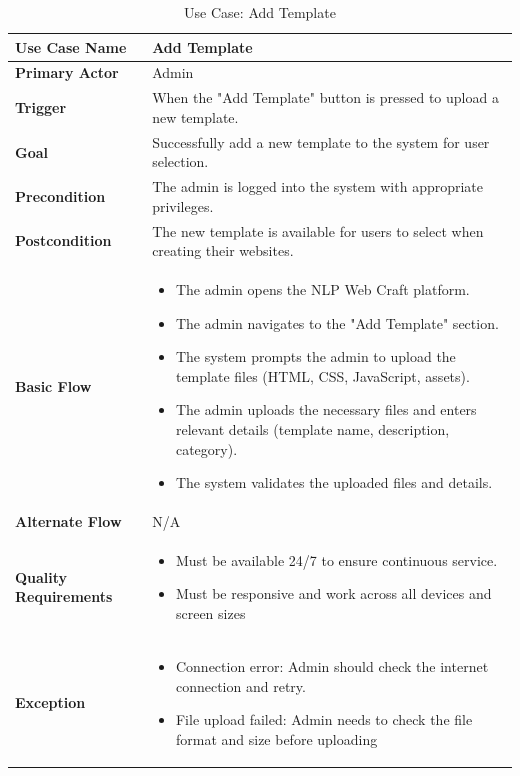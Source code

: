 \documentclass[12pt]{report}
\begin{document}
\clearpage
\begin{table}[h!]

\begin{tabular}{|p{3.5cm}|p{10cm}|}
\hline
\textbf{Use Case Name} & Add Template \\ 
\hline
\textbf{Primary Actor} & Admin \\ 
\hline
\textbf{Trigger} & When the "Add Template" button is pressed to upload a new template. \\ 
\hline
\textbf{Goal} & Successfully add a new template to the system for user selection. \\ 
\hline
\textbf{Precondition} & The admin is logged into the system with appropriate privileges. \\ 
\hline
\textbf{Postcondition} & The new template is available for users to select when creating their websites. \\ 
\hline
\textbf{Basic Flow} & 
\begin{itemize}
    \item The admin opens the NLP Web Craft platform.
    \item The admin navigates to the "Add Template" section.
    \item The system prompts the admin to upload the template files (HTML, CSS, JavaScript, assets).
    \item The admin uploads the necessary files and enters relevant details (template name, description, category).
    \item The system validates the uploaded files and details.
\end{itemize} \\ 
\hline
\textbf{Alternate Flow} & N/A \\ 
\hline
\textbf{Quality Requirements} & 
\begin{itemize}
    \item Must be available 24/7 to ensure continuous service.
    \item Must be responsive and work across all devices and screen sizes
\end{itemize} \\ 
\hline
\textbf{Exception} & 
\begin{itemize}
    \item Connection error: Admin should check the internet connection and retry.
    \item File upload failed: Admin needs to check the file format and size before uploading
\end{itemize} \\ 
\hline
\end{tabular}

\caption{Use Case: Add Template}
\end{table}
\end{document}
